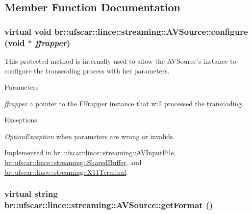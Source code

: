 \subsection{Member Function Documentation}
\hypertarget{classbr_1_1ufscar_1_1lince_1_1streaming_1_1AVSource_a728f6eaeafe68040ccd8424627658db3}{
\subsubsection[{configure}]{\setlength{\rightskip}{0pt plus 5cm}virtual void br::ufscar::lince::streaming::AVSource::configure (void $\ast$ {\em ffrapper})}}
\label{classbr_1_1ufscar_1_1lince_1_1streaming_1_1AVSource_a728f6eaeafe68040ccd8424627658db3}


This protected method is internally used to allow the AVSource's instance to configure the transcoding process with her parameters. 


\begin{DoxyParams}{Parameters}
\item[{\em ffrapper}]a pointer to the FFrapper instance that will processed the transcoding. \end{DoxyParams}

\begin{DoxyExceptions}{Exceptions}
\item[{\em OptionException}]when parameters are wrong or invalids. \end{DoxyExceptions}


Implemented in \hyperlink{classbr_1_1ufscar_1_1lince_1_1streaming_1_1AVInputFile_a66e040fd681aa8bc79d4e86f01f62f5c}{br::ufscar::lince::streaming::AVInputFile}, \hyperlink{classbr_1_1ufscar_1_1lince_1_1streaming_1_1SharedBuffer_a7479737f634864d9d5756eb41c68cec3}{br::ufscar::lince::streaming::SharedBuffer}, and \hyperlink{classbr_1_1ufscar_1_1lince_1_1streaming_1_1X11Terminal_ada874bb3c4ab58963a29c6ae0cdf25ed}{br::ufscar::lince::streaming::X11Terminal}.

\hypertarget{classbr_1_1ufscar_1_1lince_1_1streaming_1_1AVSource_aa3023323ba8e385f73c4abbeee5f5881}{
\subsubsection[{getFormat}]{\setlength{\rightskip}{0pt plus 5cm}virtual string br::ufscar::lince::streaming::AVSource::getFormat ()}}
\label{classbr_1_1ufscar_1_1lince_1_1streaming_1_1AVSource_aa3023323ba8e385f73c4abbeee5f5881}


